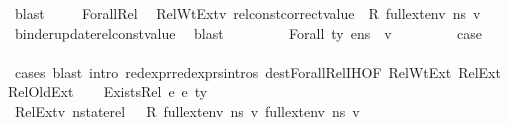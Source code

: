 \begin{isabellebody}
\ blast\ \isanewline
\ \ \isamarkupfalse%
\ Forall{\isacharunderscore}{\kern0pt}Rel\ \isamarkupfalse%
\ RelWtExt{\isacharcolon}{\kern0pt}{\isachardoublequoteopen}{\isasymAnd}v{\isachardot}{\kern0pt}\ rel{\isacharunderscore}{\kern0pt}const{\isacharunderscore}{\kern0pt}correct{\isacharunderscore}{\kern0pt}value\ {\isasymLambda}\ R\ {\isacharparenleft}{\kern0pt}full{\isacharunderscore}{\kern0pt}ext{\isacharunderscore}{\kern0pt}env\ ns{}\ v{\isacharparenright}{\kern0pt}{\isachardoublequoteclose}\ \isamarkupfalse%
\ binder{\isacharunderscore}{\kern0pt}update{\isacharunderscore}{\kern0pt}rel{\isacharunderscore}{\kern0pt}const{\isacharunderscore}{\kern0pt}value\ \isamarkupfalse%
\ blast\ \ \ \isanewline
\ \ \isamarkupfalse%
\ {\isacartoucheopen}{\isasymLambda}{\isacharcomma}{\kern0pt}{\isasymGamma}{\isacharcomma}{\kern0pt}{\isasymOmega}\ {\isasymturnstile}\ {\isasymlangle}Forall\ ty\ e{}{\isacharcomma}{\kern0pt}ns{}{\isasymrangle}\ {\isasymDown}\ v{\isacartoucheclose}\ \ \ \ \ \isanewline
\ \ \isamarkupfalse%
\ {\isacharquery}{\kern0pt}case\isanewline
\ \ \ \ \isamarkupfalse%
\ {\isacharparenleft}{\kern0pt}cases{\isacharsemicolon}{\kern0pt}\ blast\ intro{\isacharcolon}{\kern0pt}\ red{\isacharunderscore}{\kern0pt}expr{\isacharunderscore}{\kern0pt}red{\isacharunderscore}{\kern0pt}exprs{\isachardot}{\kern0pt}intros\ dest{\isacharcolon}{\kern0pt}Forall{\isacharunderscore}{\kern0pt}Rel{\isachardot}{\kern0pt}IH{\isacharparenleft}{\kern0pt}{}{\isacharparenright}{\kern0pt}{\isacharbrackleft}{\kern0pt}OF\ RelWtExt\ RelExt\ RelOldExt{\isacharbrackright}{\kern0pt}{\isacharparenright}{\kern0pt}\isanewline
{}\isamarkupfalse%
\isanewline
\ \ \isamarkupfalse%
\ {\isacharparenleft}{\kern0pt}Exists{\isacharunderscore}{\kern0pt}Rel\ e{}\ e{}\ ty{\isacharparenright}{\kern0pt}\isanewline
\ \ \isamarkupfalse%
\ RelExt{\isacharcolon}{\kern0pt}{\isachardoublequoteopen}{\isasymAnd}v{\isachardot}{\kern0pt}\ nstate{\isacharunderscore}{\kern0pt}rel\ {\isasymLambda}\ {\isasymLambda}{\isacharprime}{\kern0pt}\ R\ {\isacharparenleft}{\kern0pt}full{\isacharunderscore}{\kern0pt}ext{\isacharunderscore}{\kern0pt}env\ ns{}\ v{\isacharparenright}{\kern0pt}\ {\isacharparenleft}{\kern0pt}full{\isacharunderscore}{\kern0pt}ext{\isacharunderscore}{\kern0pt}env\ ns{}\ v{\isacharparenright}{\kern0pt}{\isachardoublequoteclose}\ \isamarkupfalse%

\end{isabellebody}
